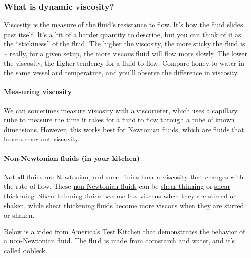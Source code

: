 \documentclass[11pt]{article}
\begin{document}
\subsubsection{What is dynamic
viscosity?}\label{what-is-dynamic-viscosity}

Viscosity is the measure of the fluid's resistance to flow. It's how the
fluid slides past itself. It's a bit of a harder quantity to describe,
but you can think of it as the ``stickiness'' of the fluid. The higher
the viscosity, the more sticky the fluid is -- really, for a given
setup, the more viscous fluid will flow more slowly. The lower the
viscosity, the higher tendency for a fluid to flow. Compare honey to
water in the same vessel and temperature, and you'll observe the
difference in viscosity.

\paragraph{Measuring viscosity}\label{measuring-viscosity}

We can sometimes measure viscosity with a
\href{https://en.wikipedia.org/wiki/Viscometer}{viscometer}, which uses
a \href{https://en.wikipedia.org/wiki/Capillary_tube}{capillary tube} to
measure the time it takes for a fluid to flow through a tube of known
dimensions. However, this works best for
\href{https://en.wikipedia.org/wiki/Newtonian_fluid}{Newtonian fluids},
which are fluids that have a constant viscosity.

\paragraph{Non-Newtonian fluids (in your
kitchen)}\label{non-newtonian-fluids-in-your-kitchen}

Not all fluids are Newtonian, and some fluids have a viscosity that
changes with the rate of flow. These
\href{https://en.wikipedia.org/wiki/Non-Newtonian_fluid}{non-Newtonian
fluids} can be \href{https://en.wikipedia.org/wiki/Shear_thinning}{shear
thinning} or \href{https://en.wikipedia.org/wiki/Shear_thickening}{shear
thickening}. Shear thinning fluids become less viscous when they are
stirred or shaken, while shear thickening fluids become more viscous
when they are stirred or shaken.

Below is a video from
\href{https://www.americastestkitchen.com/}{America's Test Kitchen} that
demonstrates the behavior of a non-Newtonian fluid. The fluid is made
from cornstarch and water, and it's called
\href{https://en.wikipedia.org/wiki/Oobleck}{oobleck}.
\end{document}
